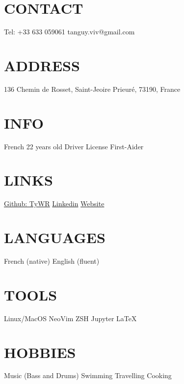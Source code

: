 \documentclass[]{cv-style}
\begin{document}
%
\begin{aside}
%
\section{CONTACT}\vspace{0.1cm}
Tel: +33 633 059061
tanguy.viv@gmail.com
%
\section{ADDRESS}\vspace{0.1cm}
136 Chemin de Rosset,
Saint-Jeoire Prieuré,
73190,
France
%
\section{INFO}\vspace{0.1cm}
French
22 years old
Driver License
First-Aider
%
\section{LINKS}\vspace{0.1cm}
\href{https://github.com/TyWR}{Github: TyWR}
\href{https://www.linkedin.com/in/tanguy-vivier/}{Linkedin}
\href{https://tywr.github.io/}{Website}
%
\section{LANGUAGES}\vspace{0.1cm}
French (native)
English (fluent)
%
\section{TOOLS}\vspace{0.1cm}
Linux/MacOS
NeoVim
ZSH
Jupyter
\LaTeX{}
%
\section{HOBBIES} \vspace{0.1cm}
Music
(Bass and Drums)
Swimming
Travelling
Cooking
%
\end{aside}
\vspace{0.15cm}
\end{document}
